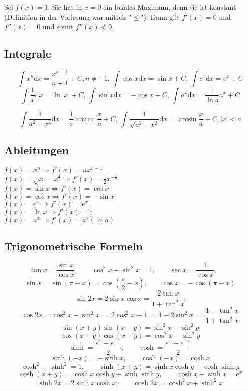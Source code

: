 \documentclass[10pt,a4paper^, twocolumn]{article}
\renewcommand{\d}{\mathrm{d}} %
\begin{document}
Sei $f(x) =1$. Sie hat in $x=0$ ein lokales Maximum, denn sie ist konstant (Definition in der Vorlesung war mittels "$\leq$"). Dann gilt $f'(x) = 0$ und $f''(x) = 0$ und somit $f''(x) \not< 0$.\\

\subsection{Integrale}

$$ \int x^n \d x = \frac{x^{n+1}}{n+1} + C, n \neq -1, \, \int \cos{x} \d x = \sin{x} + C, \, \int e^x \d x = e^x + C $$
$$ \int \frac{1}{x} \d x = \ln |x| + C, \, \int \sin{x} \d x = - \cos{x} + C, \, \int a^x \d x = \frac{1}{\ln{a}} a^x + C$$

$$ \int \frac{1}{a^2 + x^2} \d x = \frac{1}{a} \arctan{\frac{x}{a}} + C , \, \int \frac{1}{\sqrt{a^2-x^2}} \d x = \arcsin{\frac{x}{a}} + C, |x| < a $$


\subsection{Ableitungen}

$f(x) = x^n \Rightarrow f'(x) = nx^{n-1}$ \\
$f(x) = \sqrt{x} = x^{\frac{1}{2}} \Rightarrow f'(x) = \frac{1}{2}x^{-\frac{1}{2}}$\\
$f(x) = \sin{x} \Rightarrow f'(x) = \cos{x}$ \\
$f(x) = \cos{x} \Rightarrow f'(x) = - \sin{x}$ \\
$f(x) = e^x \Rightarrow f'(x) = e^x $ \\
$f(x) = \ln{x} \Rightarrow f'(x) = \frac{1}{x}$ \\
$f(x) = a^x \Rightarrow f'(x) = a^x (\ln{a})$\\

\subsection{Trigonometrische Formeln}
$$
	\tan x = \frac{\sin x}{\cos x} , \qquad
	\cos^2 x + \sin^2 x = 1, \qquad
	\sec x = \frac{1}{\cos x}, \qquad
$$
$$
	\sin x = \sin ( \pi - x) =  \cos \left( \frac{\pi}{2} - x \right), \qquad
	\cos x = - \cos (\pi - x)
$$
$$
	\sin 2x = 2 \sin x \cos x = \frac{2 \tan x}{1+\tan^2 x}
$$
$$
	\cos 2x = \cos^2 x- \sin^2 x \, = \, 2 \cos^2 x - 1 \, = \, 1 - 2 \sin^2 x 
	\, = \, \frac{1 - \tan^2 x}{1 + \tan^2 x}
$$
$$
	\sin (x + y) \sin (x - y) = \sin^2 x - \sin^2 y 
$$
$$
	\cos (x + y) \cos (x - y) = \cos^2 x - \sin^2 y
$$
$$
	\sinh = \frac{e^x - e^{-x}}{2}, \qquad \cosh = \frac{e^x + e^{-x}}{2}
$$
$$
	\sinh (-x) = - \sinh x, \qquad
	\cosh (-x) = \cosh x
$$
$$
	\cosh^2 - \sinh^2 = 1, \qquad
	\sinh (x+y) = \sinh x \cosh y + \cosh \sinh y
$$
$$	
	\cosh (x+y) = \cosh x \cosh y + \sinh \sinh y, \qquad
	\cosh x + \sinh x = e^x
$$
$$
	\sinh 2x = 2 \sinh x \cosh x, \qquad
	\cosh 2x = \cosh^2 x + \sinh^2 x
$$
%
%
%
%
%
%
%
%
%
%
\end{document}
